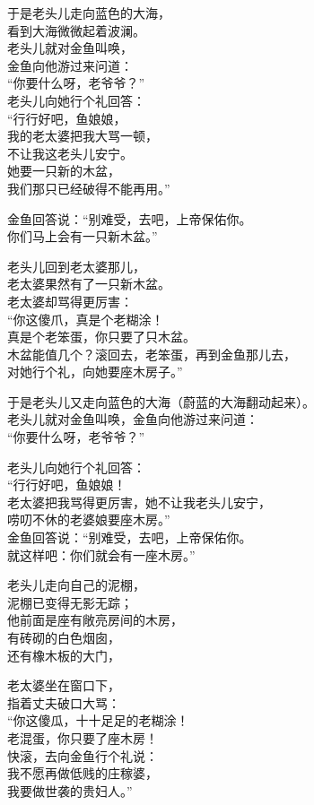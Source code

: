 \documentclass[
]{book}
\renewenvironment{quote}{\begin{VF}}{\end{VF}}
\begin{document}
\begin{quote}
于是老头儿走向蓝色的大海，\\
看到大海微微起着波澜。\\
老头儿就对金鱼叫唤，\\
金鱼向他游过来问道：\\
``你要什么呀，老爷爷？''\\
老头儿向她行个礼回答：\\
``行行好吧，鱼娘娘，\\
我的老太婆把我大骂一顿，\\
不让我这老头儿安宁。\\
她要一只新的木盆，\\
我们那只已经破得不能再用。''

金鱼回答说：``别难受，去吧，上帝保佑你。\\
你们马上会有一只新木盆。''

老头儿回到老太婆那儿，\\
老太婆果然有了一只新木盆。\\
老太婆却骂得更厉害：\\
``你这傻爪，真是个老糊涂！\\
真是个老笨蛋，你只要了只木盆。\\
木盆能值几个？滚回去，老笨蛋，再到金鱼那儿去，\\
对她行个礼，向她要座木房子。''

于是老头儿又走向蓝色的大海（蔚蓝的大海翻动起来）。\\
老头儿就对金鱼叫唤，金鱼向他游过来问道：\\
``你要什么呀，老爷爷？''

老头儿向她行个礼回答：\\
``行行好吧，鱼娘娘！\\
老太婆把我骂得更厉害，她不让我老头儿安宁，\\
唠叨不休的老婆娘要座木房。''\\
金鱼回答说：``别难受，去吧，上帝保佑你。\\
就这样吧：你们就会有一座木房。''

老头儿走向自己的泥棚，\\
泥棚已变得无影无踪；\\
他前面是座有敞亮房间的木房，\\
有砖砌的白色烟囱，\\
还有橡木板的大门，

老太婆坐在窗口下，\\
指着丈夫破口大骂：\\
``你这傻瓜，十十足足的老糊涂！\\
老混蛋，你只要了座木房！\\
快滚，去向金鱼行个礼说：\\
我不愿再做低贱的庄稼婆，\\
我要做世袭的贵妇人。''


\end{quote}
\end{document}
